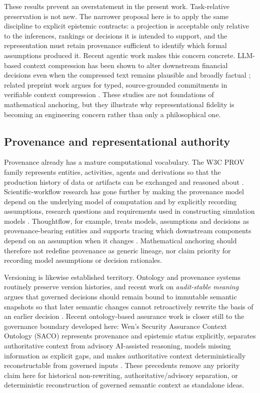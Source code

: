 \documentclass[11pt,a4paper]{article}
\begin{document}
These results prevent an overstatement in the present work. Task-relative preservation is not new. The narrower proposal here is to apply the same discipline to explicit epistemic contracts: a projection is acceptable only relative to the inferences, rankings or decisions it is intended to support, and the representation must retain provenance sufficient to identify which formal assumptions produced it. Recent agentic work makes this concern concrete. LLM-based context compression has been shown to alter downstream financial decisions even when the compressed text remains plausible and broadly factual \cite{lee2026}; related preprint work argues for typed, source-grounded commitments in verifiable context compression \cite{trukhina2026}. These studies are not foundations of mathematical anchoring, but they illustrate why representational fidelity is becoming an engineering concern rather than only a philosophical one.

\subsection{Provenance and representational authority}
Provenance already has a mature computational vocabulary. The W3C PROV family represents entities, activities, agents and derivations so that the production history of data or artifacts can be exchanged and reasoned about \cite{w3cProv2013}. Scientific-workflow research has gone further by making the provenance model depend on the underlying model of computation and by explicitly recording assumptions, research questions and requirements used in constructing simulation models \cite{ludascher2008,budde2021}. Thoughtflow, for example, treats models, assumptions and decisions as provenance-bearing entities and supports tracing which downstream components depend on an assumption when it changes \cite{wilkins2017}. Mathematical anchoring should therefore not redefine provenance as generic lineage, nor claim priority for recording model assumptions or decision rationales.

Versioning is likewise established territory. Ontology and provenance systems routinely preserve version histories, and recent work on \emph{audit-stable meaning} argues that governed decisions should remain bound to immutable semantic snapshots so that later semantic changes cannot retroactively rewrite the basis of an earlier decision \cite{meyman2026}. Recent ontology-based assurance work is closer still to the governance boundary developed here: Wen's Security Assurance Context Ontology (SACO) represents provenance and epistemic status explicitly, separates authoritative context from advisory AI-assisted reasoning, models missing information as explicit gaps, and makes authoritative context deterministically reconstructable from governed inputs \cite{wen2026}. These precedents remove any priority claim here for historical non-rewriting, authoritative/advisory separation, or deterministic reconstruction of governed semantic context as standalone ideas.
\end{document}

